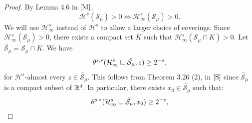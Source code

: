 \documentclass[11pt]{article}
\theoremstyle{definition}
\theoremstyle{remark}
\numberwithin{equation}{section}
\newcommand{\res}{\hbox{{\vrule height .22cm}{\leaders\hrule\hskip .2cm}}}
\def\res{\hbox{ {\vrule height .22cm}{\leaders\hrule\hskip.2cm} } }
\begin{document}
\begin{proof}
By Lemma 4.6 in $\cite{M}$, $$\mathcal{H}^{s}(\mathcal{S}_{\mu}) >0 \iff \mathcal{H}^{s}_{\infty}(\mathcal{S}_{\mu}) >0.$$
We will use $\mathcal{H}^{s}_{\infty}$ instead of $\mathcal{H}^{s}$ to allow a larger choice of coverings.
Since $\mathcal{H}_{\infty}^{s}(\mathcal{S}_{\mu} )>0$, there exists a compact set $K$ such that $\mathcal{H}_{\infty}^{s}(\mathcal{S}_{\mu} \cap K )>0$. Let $\tilde{\mathcal{S}_{\mu}}= \mathcal{S_{\mu}} \cap K$.
We have
\begin{equation}\label{densityupper'}
\theta^{s,*}(\mathcal{H}^{s}_{\infty}\res \tilde{{\mathcal{S}_{\mu}} }, z) \geq 2^{-s},
\end{equation}
for $\mathcal{H}^{s}$-almost every $z \in  \tilde{\mathcal{S}_{\mu}}$.
This follows from Theorem 3.26 (2), in $\cite{S}$ since $\tilde{\mathcal{S}_{\mu}}$ is a compact subset of $\mathbb{R}^d$.
In particular, there exists $x_0 \in \tilde{\mathcal{S}_{\mu}}$ such that:
\begin{equation}
\theta^{s,*}(\mathcal{H}^{s}_{\infty}\res \tilde{{\mathcal{S}_{\mu}} }, x_0) \geq 2^{-s},
\end{equation}


\end{proof}
\end{document}
